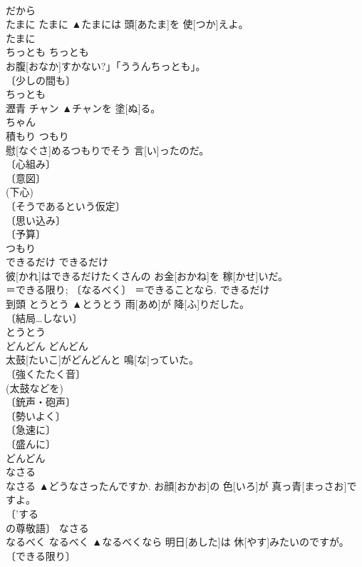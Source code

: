 \documentclass[8pt]{extreport}
\begin{document}
\begin{CJK}{UTF8}{min}
\\	だから	
\\	たまに	たまに	▲たまには 頭[あたま]を 使[つか]えよ。	
\\	たまに	
\\	ちっとも	ちっとも	
\\	お腹[おなか]すかない?」「ううんちっとも」。	
\\	〔少しの間も〕 
\\	[＝すこしも]		ちっとも	
\\	瀝青	チャン	▲チャンを 塗[ぬ]る。	
\\	ちゃん	
\\	積もり	つもり	
\\	慰[なぐさ]めるつもりでそう 言[い]ったのだ。	
\\	〔心組み〕 
\\	〔意図〕 
\\	(下心) 
\\	〔そうであるという仮定〕 
\\	〔思い込み〕 
\\	〔予算〕 
\\	[⇒みつもり]		つもり	
\\	できるだけ	できるだけ	
\\	彼[かれ]はできるだけたくさんの お金[おかね]を 稼[かせ]いだ。	
\\	＝できる限り; 〔なるべく〕 ＝できることなら.		できるだけ	
\\	到頭	とうとう	▲とうとう 雨[あめ]が 降[ふ]りだした。	
\\	〔結局…しない〕 
\\	とうとう	
\\	どんどん	どんどん	
\\	太鼓[たいこ]がどんどんと 鳴[な]っていた。	
\\	〔強くたたく音〕 
\\	(太鼓などを) 
\\	〔銃声・砲声〕 
\\	〔勢いよく〕 
\\	〔急速に〕 
\\	〔盛んに〕 
\\	[＝どしどし]		どんどん	
\\	なさる	
\\	なさる	▲どうなさったんですか. お顔[おかお]の 色[いろ]が 真っ青[まっさお]ですよ。	
\\	〔'する
\\	の尊敬語〕		なさる	
\\	なるべく	なるべく	▲なるべくなら 明日[あした]は 休[やす]みたいのですが。	
\\	〔できる限り〕 

\end{CJK}
\end{document}
